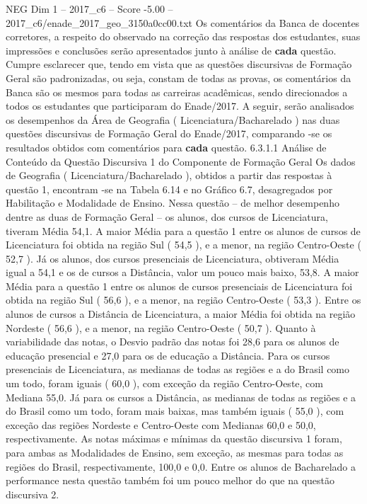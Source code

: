 \begin{textsample}{NEG Dim 1 – 2017\_c6 – Score -5.00 – 2017\_c6/enade\_2017\_geo\_3150a0cc00.txt}
Os comentários da Banca de docentes corretores, a respeito do observado na correção das respostas dos estudantes, suas impressões e conclusões serão apresentados junto à análise de \textbf{cada} questão.
Cumpre esclarecer que, tendo em vista que as questões discursivas de Formação Geral são padronizadas, ou seja, constam de todas as provas, os comentários da Banca são os mesmos para todas as carreiras acadêmicas, sendo direcionados a todos os estudantes que participaram do Enade/2017.
A seguir, serão analisados os desempenhos da Área de Geografia ( Licenciatura/Bacharelado ) nas duas questões discursivas de Formação Geral do Enade/2017, comparando -se os resultados obtidos com comentários para \textbf{cada} questão. 6.3.1.1 Análise de Conteúdo da Questão Discursiva 1 do Componente de Formação Geral Os dados de Geografia ( Licenciatura/Bacharelado ), obtidos a partir das respostas à questão 1, encontram -se na Tabela 6.14 e no Gráfico 6.7, desagregados por Habilitação e Modalidade de Ensino.
Nessa questão – de melhor desempenho dentre as duas de Formação Geral – os alunos, dos cursos de Licenciatura, tiveram Média 54,1.
A maior Média para a questão 1 entre os alunos de cursos de Licenciatura foi obtida na região Sul ( 54,5 ), e a menor, na região Centro-Oeste ( 52,7 ).
Já os alunos, dos cursos presenciais de Licenciatura, obtiveram Média igual a 54,1 e os de cursos a Distância, valor um pouco mais baixo, 53,8.
A maior Média para a questão 1 entre os alunos de cursos presenciais de Licenciatura foi obtida na região Sul ( 56,6 ), e a menor, na região Centro-Oeste ( 53,3 ).
Entre os alunos de cursos a Distância de Licenciatura, a maior Média foi obtida na região Nordeste ( 56,6 ), e a menor, na região Centro-Oeste ( 50,7 ).
Quanto à variabilidade das notas, o Desvio padrão das notas foi 28,6 para os alunos de educação presencial e 27,0 para os de educação a Distância.
Para os cursos presenciais de Licenciatura, as medianas de todas as regiões e a do Brasil como um todo, foram iguais ( 60,0 ), com exceção da região Centro-Oeste, com Mediana 55,0.
Já para os cursos a Distância, as medianas de todas as regiões e a do Brasil como um todo, foram mais baixas, mas também iguais ( 55,0 ), com exceção das regiões Nordeste e Centro-Oeste com Medianas 60,0 e 50,0, respectivamente.
As notas máximas e mínimas da questão discursiva 1 foram, para ambas as Modalidades de Ensino, sem exceção, as mesmas para todas as regiões do Brasil, respectivamente, 100,0 e 0,0.
Entre os alunos de Bacharelado a performance nesta questão também foi um pouco melhor do que na questão discursiva 2.

\end{textsample}
